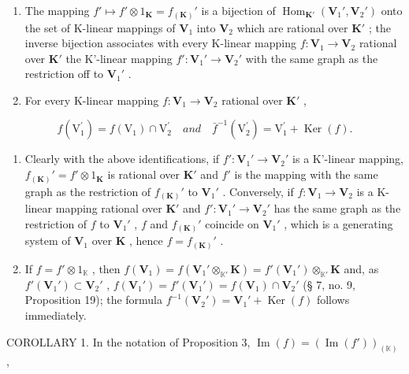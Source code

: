 \begin{enumerate}
\def\labelenumi{(\roman{enumi})}
\item
  The mapping \(f' \mapsto f' \otimes 1_{\mathbf{K}} = f_{(\mathbf{K})}'\) is a bijection of \(\operatorname{Hom}_{\mathbf{K}'}(\mathbf{V}_1', \mathbf{V}_2')\) onto the set of K-linear mappings of \(\mathbf{V}_1\) into \(\mathbf{V}_2\) which are rational over \(\mathbf{K}'\) ; the inverse bijection associates with every K-linear mapping \(f: \mathbf{V}_1 \to \mathbf{V}_2\) rational over \(\mathbf{K}'\) the K'-linear mapping \(f': \mathbf{V}_1' \to \mathbf{V}_2'\) with the same graph as the restriction off to \(\mathbf{V}_1'\) .
\item
  For every K-linear mapping \(f: \mathbf{V}_1 \to \mathbf{V}_2\) rational over \(\mathbf{K}'\) ,
\end{enumerate}

\[
f (\mathrm{V} _ {1} ^ {\prime}) = f (\mathrm{V} _ {1}) \cap \mathrm{V} _ {2} ^ {\prime} \quad and \quad \bar {f} ^ {- 1} (\mathrm{V} _ {2} ^ {\prime}) = \mathrm{V} _ {1} ^ {\prime} + \operatorname{Ker} (f).
\]

\begin{enumerate}
\def\labelenumi{(\roman{enumi})}
\item
  Clearly with the above identifications, if \(f': \mathbf{V}_1' \to \mathbf{V}_2'\) is a K'-linear mapping, \(f_{(\mathbf{K})}' = f' \otimes 1_{\mathbf{K}}\) is rational over \(\mathbf{K}'\) and \(f'\) is the mapping with the same graph as the restriction of \(f_{(\mathbf{K})}'\) to \(\mathbf{V}_1'\) . Conversely, if \(f: \mathbf{V}_1 \to \mathbf{V}_2\) is a K-linear mapping rational over \(\mathbf{K}'\) and \(f': \mathbf{V}_1' \to \mathbf{V}_2'\) has the same graph as the restriction of \(f\) to \(\mathbf{V}_1'\) , \(f\) and \(f_{(\mathbf{K})}'\) coincide on \(\mathbf{V}_1'\) , which is a generating system of \(\mathbf{V}_1\) over \(\mathbf{K}\) , hence \(f = f_{(\mathbf{K})}'\) .
\item
  If \(f = f' \otimes 1_{\mathbb{K}}\) , then \(f(\mathbf{V}_1) = f(\mathbf{V}_1' \otimes_{\mathbb{K}'} \mathbf{K}) = f'(\mathbf{V}_1') \otimes_{\mathbb{K}'} \mathbf{K}\) and, as \(f'(\mathbf{V}_1') \subset \mathbf{V}_2'\) , \(f(\mathbf{V}_1') = f'(\mathbf{V}_1') = f(\mathbf{V}_1) \cap \mathbf{V}_2'\) (§ 7, no. 9, Proposition 19); the formula \(f^{-1}(\mathbf{V}_2') = \mathbf{V}_1' + \operatorname{Ker}(f)\) follows immediately.
\end{enumerate}

COROLLARY 1. In the notation of Proposition 3, \(\operatorname{Im}(f) = (\operatorname{Im}(f'))_{(\mathbb{K})}\) ,

